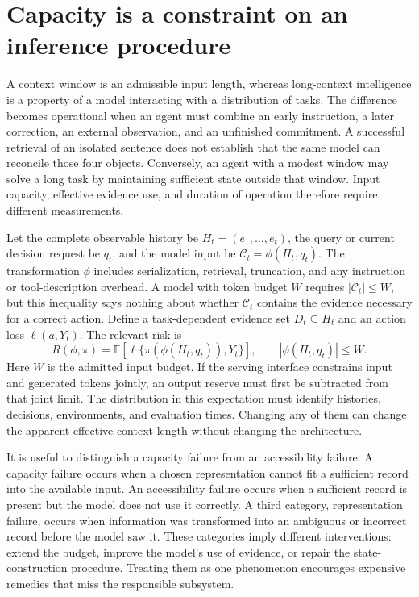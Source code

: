 \section{Capacity is a constraint on an inference procedure}\label{sec:C11:capacity}
A context window is an admissible input length, whereas long-context intelligence is a property of a model interacting with a distribution of tasks. The difference becomes operational when an agent must combine an early instruction, a later correction, an external observation, and an unfinished commitment. A successful retrieval of an isolated sentence does not establish that the same model can reconcile those four objects. Conversely, an agent with a modest window may solve a long task by maintaining sufficient state outside that window. Input capacity, effective evidence use, and duration of operation therefore require different measurements.

Let the complete observable history be $H_t=(e_1,\ldots,e_t)$, the query or current decision request be $q_t$, and the model input be $\mathcal C_t=\phi(H_t,q_t)$. The transformation $\phi$ includes serialization, retrieval, truncation, and any instruction or tool-description overhead. A model with token budget $W$ requires $|\mathcal C_t|\leq W$, but this inequality says nothing about whether $\mathcal C_t$ contains the evidence necessary for a correct action. Define a task-dependent evidence set $D_t\subseteq H_t$ and an action loss $\ell(a,Y_t)$. The relevant risk is
\begin{equation}
 R(\phi,\pi)=\mathbb E\!\left[\ell\{\pi(\phi(H_t,q_t)),Y_t\}\right],
 \qquad |\phi(H_t,q_t)|\leq W.
\end{equation}
Here $W$ is the admitted input budget. If the serving interface constrains input and generated tokens jointly, an output reserve must first be subtracted from that joint limit. The distribution in this expectation must identify histories, decisions, environments, and evaluation times. Changing any of them can change the apparent effective context length without changing the architecture.

It is useful to distinguish a capacity failure from an accessibility failure. A capacity failure occurs when a chosen representation cannot fit a sufficient record into the available input. An accessibility failure occurs when a sufficient record is present but the model does not use it correctly. A third category, representation failure, occurs when information was transformed into an ambiguous or incorrect record before the model saw it. These categories imply different interventions: extend the budget, improve the model's use of evidence, or repair the state-construction procedure. Treating them as one phenomenon encourages expensive remedies that miss the responsible subsystem.

